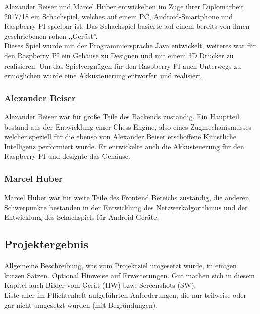 \documentclass[12pt,a4paper]{article}
\newcommand{\yhbu}[0]{\color{ydkbu}}	%
\begin{document}
{	Alexander Beiser und Marcel Huber entwickelten im Zuge ihrer Diplomarbeit 2017/18 ein Schachspiel, welches auf einem PC, Android-Smartphone und Raspberry PI spielbar ist. Das Schachspiel basierte auf einem bereits von ihnen geschriebenen rohen ,,Gerüst''. \\
	Dieses Spiel wurde mit der Programmiersprache Java entwickelt, weiteres war für den Raspberry PI ein Gehäuse zu Designen und mit einem 3D Drucker zu realisieren. Um das Spielvergnügen für den Raspberry PI auch Unterwegs zu ermöglichen wurde eine Akkusteuerung entworfen und realisiert. \\
	\subsubsection{Alexander Beiser}
	Alexander Beiser war für große Teile des Backends zuständig. Ein Hauptteil bestand aus der Entwicklung einer Chess Engine, also eines Zugmechanismusses welcher speziell für die ebenso von Alexander Beiser erschoffene Künstliche Intelligenz performiert wurde. Er entwickelte auch die Akkusteuerung für den Raspberry PI und designte das Gehäuse.
	
	\subsubsection{Marcel Huber}
	Marcel Huber war für weite Teile des Frontend Bereichs zuständig, die anderen Schwerpunkte bestanden in der Entwicklung des Netzwerkalgorithmus und der Entwicklung des Schachspiels für Android Geräte. 
 
	\vfill
	\newpage	
	
 \subsection{Projektergebnis}
	{\yhbu
	Allgemeine Beschreibung, was vom Projektziel umgesetzt wurde, in einigen kurzen Sätzen.
	Optional Hinweise auf Erweiterungen.
	Gut machen sich in diesem Kapitel auch Bilder vom Gerät (HW) bzw. Screenshots (SW).
	\\[1mm]
	Liste aller im Pflichtenheft aufgeführten Anforderungen,
	die nur teilweise oder gar nicht umgesetzt wurden (mit Begründungen).
	}










}
\end{document}
